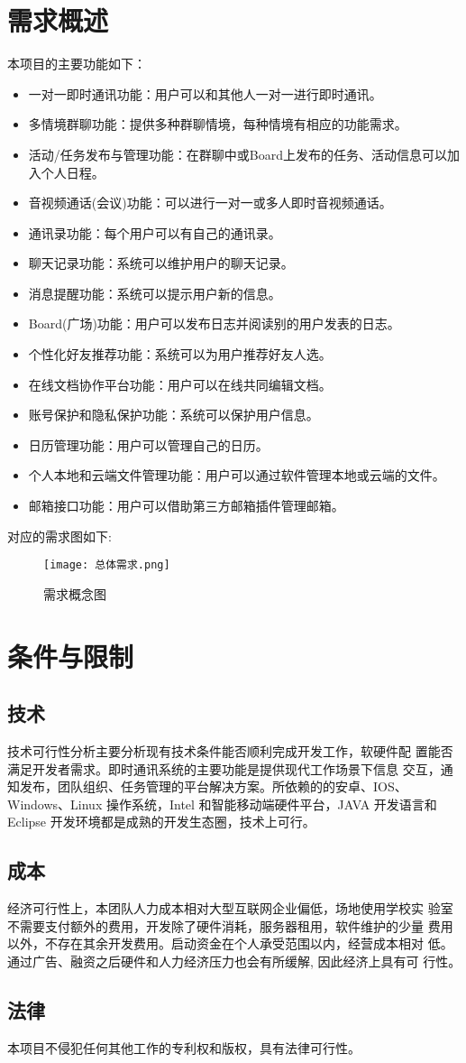 \section{需求概述}
本项目的主要功能如下：
\begin{itemize}
	\item 一对一即时通讯功能：用户可以和其他人一对一进行即时通讯。
	\item 多情境群聊功能：提供多种群聊情境，每种情境有相应的功能需求。
	\item 活动/任务发布与管理功能：在群聊中或Board上发布的任务、活动信息可以加入个人日程。
	\item 音视频通话(会议)功能：可以进行一对一或多人即时音视频通话。
	\item 通讯录功能：每个用户可以有自己的通讯录。
	\item 聊天记录功能：系统可以维护用户的聊天记录。
	\item 消息提醒功能：系统可以提示用户新的信息。
	\item Board(广场)功能：用户可以发布日志并阅读别的用户发表的日志。
	\item 个性化好友推荐功能：系统可以为用户推荐好友人选。
	\item 在线文档协作平台功能：用户可以在线共同编辑文档。
	\item 账号保护和隐私保护功能：系统可以保护用户信息。
	\item 日历管理功能：用户可以管理自己的日历。
	\item 个人本地和云端文件管理功能：用户可以通过软件管理本地或云端的文件。
	\item 邮箱接口功能：用户可以借助第三方邮箱插件管理邮箱。
\end{itemize}

对应的需求图如下:
\newpage
\begin{figure}[ht]
            \centering
            \texttt{[image: 总体需求.png]}\label{tab:classification}
            \caption{需求概念图}\label{fig:noted-figure}
        \end{figure}

\section{条件与限制}
\subsection{技术}
技术可行性分析主要分析现有技术条件能否顺利完成开发工作，软硬件配
置能否满足开发者需求。即时通讯系统的主要功能是提供现代工作场景下信息
交互，通知发布，团队组织、任务管理的平台解决方案。所依赖的的安卓、IOS、
Windows、Linux 操作系统，Intel 和智能移动端硬件平台，JAVA 开发语言和 Eclipse
开发环境都是成熟的开发生态圈，技术上可行。
\subsection{成本}
经济可行性上，本团队人力成本相对大型互联网企业偏低，场地使用学校实
验室不需要支付额外的费用，开发除了硬件消耗，服务器租用，软件维护的少量
费用以外，不存在其余开发费用。启动资金在个人承受范围以内，经营成本相对
低。通过广告、融资之后硬件和人力经济压力也会有所缓解, 因此经济上具有可
行性。
\subsection{法律}
本项目不侵犯任何其他工作的专利权和版权，具有法律可行性。
